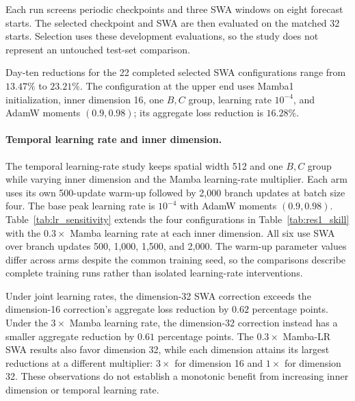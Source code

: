 \documentclass{article}
\begin{document}
Each run screens periodic checkpoints and three SWA windows on eight forecast starts. The selected checkpoint and SWA are then evaluated on the matched 32 starts. Selection uses these development evaluations, so the study does not represent an untouched test-set comparison.

Day-ten reductions for the 22 completed selected SWA configurations range from $13.47\%$ to $23.21\%$. The configuration at the upper end uses Mamba1 initialization, inner dimension 16, one $B,C$ group, learning rate $10^{-4}$, and AdamW moments $(0.9,0.98)$; its aggregate loss reduction is $16.28\%$.

\paragraph{Temporal learning rate and inner dimension.}
The temporal learning-rate study keeps spatial width 512 and one $B,C$ group while varying inner dimension and the Mamba learning-rate multiplier. Each arm uses its own 500-update warm-up followed by 2,000 branch updates at batch size four. The base peak learning rate is $10^{-4}$ with AdamW moments $(0.9,0.98)$. Table~\ref{tab:lr_sensitivity} extends the four configurations in Table~\ref{tab:res1_skill} with the $0.3\times$ Mamba learning rate at each inner dimension. All six use SWA over branch updates 500, 1,000, 1,500, and 2,000. The warm-up parameter values differ across arms despite the common training seed, so the comparisons describe complete training runs rather than isolated learning-rate interventions.

Under joint learning rates, the dimension-32 SWA correction exceeds the dimension-16 correction's aggregate loss reduction by $0.62$ percentage points. Under the $3\times$ Mamba learning rate, the dimension-32 correction instead has a smaller aggregate reduction by $0.61$ percentage points. The $0.3\times$ Mamba-LR SWA results also favor dimension 32, while each dimension attains its largest reductions at a different multiplier: $3\times$ for dimension 16 and $1\times$ for dimension 32. These observations do not establish a monotonic benefit from increasing inner dimension or temporal learning rate.
\end{document}
